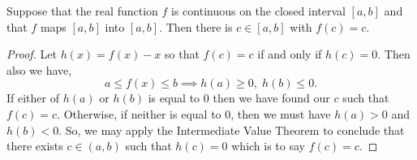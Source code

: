 \documentclass[../MathsNotesBase.tex]{subfiles}
\begin{document}
	\bigskip
	\begin{corollary}
		\label{coro:continuous_func_mapping_interval_to_itself_has_invariant_point}
		Suppose that the real function $f$ is continuous on the closed interval ${ [a,b] }$ and that $f$ maps ${ [a,b] }$ into ${ [a,b] }$. Then there is ${ c \in [a,b] }$ with ${ f(c) = c }$.
	\end{corollary}
	\begin{proof}
		Let ${ h(x) = f(x) - x }$ so that ${ f(c) = c }$ if and only if ${ h(c) = 0 }$. Then also we have,
		\[ a \leq f(x) \leq b \implies h(a) \geq 0,\; h(b) \leq 0. \]
		If either of $h(a)$ or $h(b)$ is equal to 0 then we have found our $c$ such that ${ f(c) = c }$. Otherwise, if neither is equal to 0, then we must have ${ h(a) > 0 }$ and ${ h(b) < 0 }$. So, we may apply the Intermediate Value Theorem to conclude that there exists ${ c \in (a,b) }$ such that ${ h(c) = 0 }$ which is to say ${ f(c) = c }$.
	\end{proof}
\end{document}
